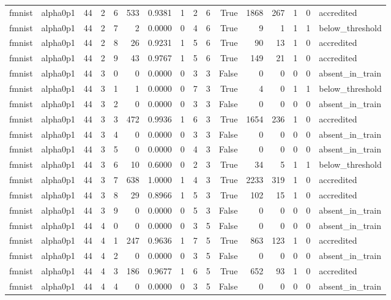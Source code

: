 \begin{tabular}{llrrrrrrrrrrrrrl}
fmnist & alpha0p1 & 44 & 2 & 6 & 533 & 0.9381 & 1 & 2 & 6 & True & 1868 & 267 & 1 & 0 & accredited \\
fmnist & alpha0p1 & 44 & 2 & 7 & 2 & 0.0000 & 0 & 4 & 6 & True & 9 & 1 & 1 & 1 & below\_threshold \\
fmnist & alpha0p1 & 44 & 2 & 8 & 26 & 0.9231 & 1 & 5 & 6 & True & 90 & 13 & 1 & 0 & accredited \\
fmnist & alpha0p1 & 44 & 2 & 9 & 43 & 0.9767 & 1 & 5 & 6 & True & 149 & 21 & 1 & 0 & accredited \\
fmnist & alpha0p1 & 44 & 3 & 0 & 0 & 0.0000 & 0 & 3 & 3 & False & 0 & 0 & 0 & 0 & absent\_in\_train \\
fmnist & alpha0p1 & 44 & 3 & 1 & 1 & 0.0000 & 0 & 7 & 3 & True & 4 & 0 & 1 & 1 & below\_threshold \\
fmnist & alpha0p1 & 44 & 3 & 2 & 0 & 0.0000 & 0 & 3 & 3 & False & 0 & 0 & 0 & 0 & absent\_in\_train \\
fmnist & alpha0p1 & 44 & 3 & 3 & 472 & 0.9936 & 1 & 6 & 3 & True & 1654 & 236 & 1 & 0 & accredited \\
fmnist & alpha0p1 & 44 & 3 & 4 & 0 & 0.0000 & 0 & 3 & 3 & False & 0 & 0 & 0 & 0 & absent\_in\_train \\
fmnist & alpha0p1 & 44 & 3 & 5 & 0 & 0.0000 & 0 & 4 & 3 & False & 0 & 0 & 0 & 0 & absent\_in\_train \\
fmnist & alpha0p1 & 44 & 3 & 6 & 10 & 0.6000 & 0 & 2 & 3 & True & 34 & 5 & 1 & 1 & below\_threshold \\
fmnist & alpha0p1 & 44 & 3 & 7 & 638 & 1.0000 & 1 & 4 & 3 & True & 2233 & 319 & 1 & 0 & accredited \\
fmnist & alpha0p1 & 44 & 3 & 8 & 29 & 0.8966 & 1 & 5 & 3 & True & 102 & 15 & 1 & 0 & accredited \\
fmnist & alpha0p1 & 44 & 3 & 9 & 0 & 0.0000 & 0 & 5 & 3 & False & 0 & 0 & 0 & 0 & absent\_in\_train \\
fmnist & alpha0p1 & 44 & 4 & 0 & 0 & 0.0000 & 0 & 3 & 5 & False & 0 & 0 & 0 & 0 & absent\_in\_train \\
fmnist & alpha0p1 & 44 & 4 & 1 & 247 & 0.9636 & 1 & 7 & 5 & True & 863 & 123 & 1 & 0 & accredited \\
fmnist & alpha0p1 & 44 & 4 & 2 & 0 & 0.0000 & 0 & 3 & 5 & False & 0 & 0 & 0 & 0 & absent\_in\_train \\
fmnist & alpha0p1 & 44 & 4 & 3 & 186 & 0.9677 & 1 & 6 & 5 & True & 652 & 93 & 1 & 0 & accredited \\
fmnist & alpha0p1 & 44 & 4 & 4 & 0 & 0.0000 & 0 & 3 & 5 & False & 0 & 0 & 0 & 0 & absent\_in\_train \\

\end{tabular}
